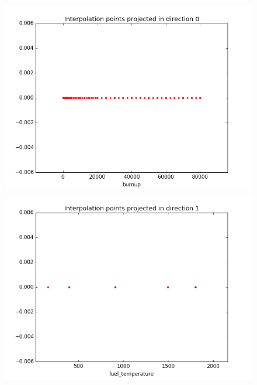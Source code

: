 \begin{figure}[h]
   \begin{minipage}[b]{0.3\linewidth}
      \centering \includegraphics[scale=0.25]{images/MOX/interpolation_points_0_macro_totale0.png}
   \end{minipage}
	 \begin{minipage}[b]{0.3\linewidth}
      \centering \includegraphics[scale=0.25]{images/MOX/interpolation_points_1_macro_totale0.png}
   \end{minipage}
	 \begin{minipage}[b]{0.3\linewidth}

\end{minipage}
\end{figure}
